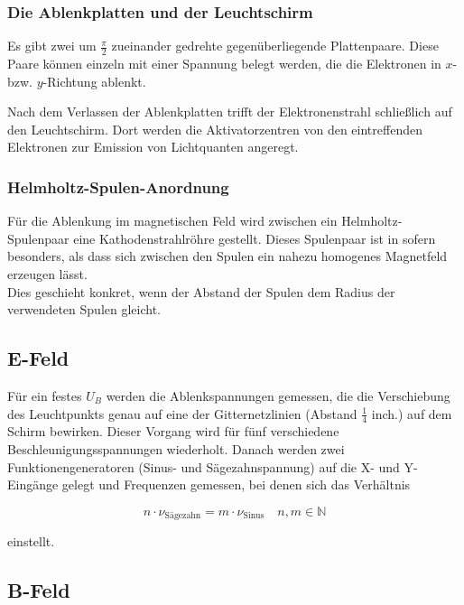 \subsubsection{Die Ablenkplatten und der Leuchtschirm}

Es gibt zwei um $\frac{\pi}{2}$ zueinander gedrehte gegenüberliegende
Plattenpaare. Diese Paare können einzeln mit einer Spannung belegt
werden, die die Elektronen in $x$- bzw. $y$-Richtung ablenkt.

Nach dem Verlassen der Ablenkplatten trifft der Elektronenstrahl
schließlich auf den Leuchtschirm. Dort werden die Aktivatorzentren von den eintreffenden Elektronen zur Emission von Lichtquanten angeregt.

\subsubsection{Helmholtz-Spulen-Anordnung}

Für die Ablenkung im magnetischen Feld wird zwischen ein Helmholtz-Spulenpaar eine Kathodenstrahlröhre gestellt. Dieses Spulenpaar ist in sofern besonders, als dass sich zwischen den Spulen ein nahezu homogenes Magnetfeld erzeugen lässt.\\
Dies geschieht konkret, wenn der Abstand der Spulen dem Radius der verwendeten Spulen gleicht. \\

\subsection{E-Feld}

Für ein festes $U_B$ werden die Ablenkspannungen gemessen, die die Verschiebung des Leuchtpunkts genau auf eine der Gitternetzlinien (Abstand $\frac{1}{4}$ inch.) auf dem Schirm bewirken. Dieser Vorgang wird für
fünf verschiedene Beschleunigungsspannungen wiederholt.
Danach werden zwei Funktionengeneratoren (Sinus- und Sägezahnspannung) auf die X- und Y-Eingänge gelegt und Frequenzen gemessen, bei denen sich das Verhältnis 

\begin{equation}
n \cdot \nu_\text{Sägezahn} = m \cdot \nu_\text{Sinus} \quad n, m\in\mathbb{N}
\end{equation}

einstellt.

\subsection{B-Feld}

